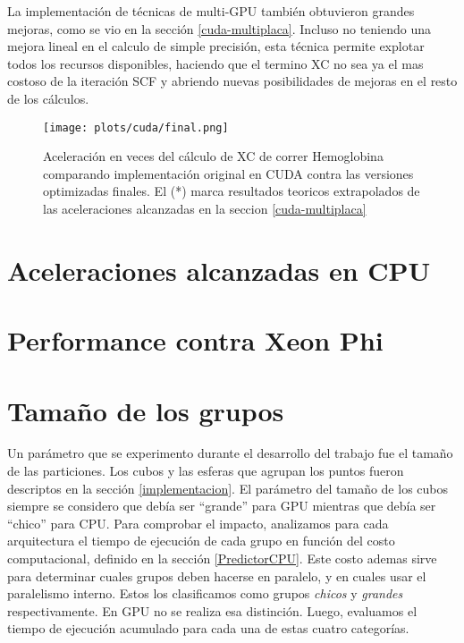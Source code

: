 La implementaci\'on de t\'ecnicas de multi-GPU tambi\'en obtuvieron grandes mejoras, como se vio en la
secci\'on \ref{cuda-multiplaca}. Incluso no teniendo una mejora lineal en el calculo de simple
precisi\'on, esta t\'ecnica permite explotar todos los recursos disponibles, haciendo que el termino
XC no sea ya el mas costoso de la iteraci\'on SCF y abriendo nuevas posibilidades de mejoras en el
resto de los c\'alculos.

\begin{figure}[htbp]
   \centering
   \texttt{[image: plots/cuda/final.png]}
   \caption{Aceleraci\'on en veces del c\'alculo de XC de correr Hemoglobina comparando implementaci\'on original en CUDA contra
   las versiones optimizadas finales. El (*) marca resultados teoricos extrapolados de las
 aceleraciones alcanzadas en la seccion \ref{cuda-multiplaca}}
   \label{fig:cuda-final}
\end{figure}


\section{Aceleraciones alcanzadas en CPU}

\section{Performance contra Xeon Phi}

\section{Tama\~no de los grupos}
\label{tamgrupos}
Un par\'ametro que se experimento durante el desarrollo del trabajo fue el tama\~no de las particiones.
Los cubos y las esferas que agrupan los puntos fueron descriptos en la secci\'on \ref{implementacion}. El par\'ametro
del tama\~no de los cubos siempre se considero que deb\'ia ser ``grande'' para GPU mientras que deb\'ia ser
``chico'' para CPU. Para comprobar el impacto, analizamos para cada arquitectura el tiempo de ejecuci\'on
de cada grupo en funci\'on del costo computacional, definido en la secci\'on \ref{PredictorCPU}. Este costo ademas
sirve para determinar cuales grupos deben hacerse en paralelo, y en cuales usar el paralelismo interno. Estos
los clasificamos como grupos \textit{chicos} y \textit{grandes} respectivamente. En GPU no se realiza esa
distinci\'on. Luego, evaluamos el tiempo de ejecuci\'on acumulado para cada una de estas cuatro categor\'ias.



